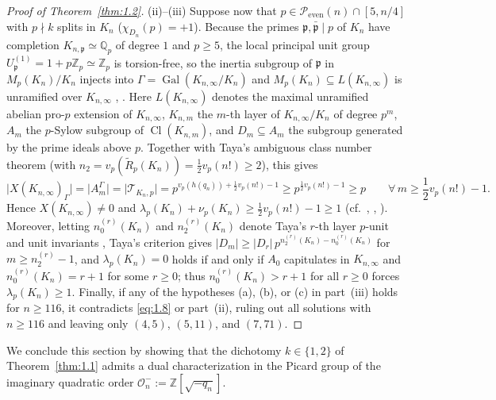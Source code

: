 \documentclass[11pt,reqno]{amsart}
\theoremstyle{remark}
\numberwithin{equation}{section}
\newcommand{\Z}{\mathbb{Z}}
\newcommand{\Q}{\mathbb{Q}}
\newcommand{\Peven}{\mathcal{P}_{\mathrm{even}}}
\DeclareMathOperator{\Gal}{Gal}
\DeclareMathOperator{\Cl}{Cl}
\begin{document}
\begin{proof}[Proof of Theorem~\ref{thm:1.2}]
(ii)--(iii) Suppose now that $p \in \Peven(n) \cap [5, n/4]$ with $p \nmid k$ splits in $K_n$ ($\chi_{D_n}(p) = +1$). Because the primes $\mathfrak{p}, \bar{\mathfrak{p}} \mid p$ of $K_n$ have completion $K_{n,\mathfrak{p}} \simeq \Q_p$ of degree $1$ and $p \ge 5$, the local principal unit group $U_{\mathfrak{p}}^{(1)} = 1 + p\Z_p \simeq \Z_p$ is torsion-free, so the inertia subgroup of $\mathfrak{p}$ in $M_p(K_n)/K_n$ injects into $\Gamma = \Gal(K_{n,\infty}/K_n)$ and $M_p(K_n) \subseteq L(K_{n,\infty})$ is unramified over $K_{n,\infty}$ \cite[Proposition~1]{Ozaki1997}, \cite[Lemmas~6.1--6.2]{Yanagisawa2026}. Here $L(K_{n,\infty})$ denotes the maximal unramified abelian pro-$p$ extension of $K_{n,\infty}$, $K_{n,m}$ the $m$-th layer of $K_{n,\infty}/K_n$ of degree $p^m$, $A_m$ the $p$-Sylow subgroup of $\Cl(K_{n,m})$, and $D_m \subseteq A_m$ the subgroup generated by the prime ideals above $p$. Together with Taya's ambiguous class number theorem \cite[Corollary~2 and Proposition~1]{Taya1996} (with $n_2 = v_p(\widetilde{R}_p(K_n)) = \frac{1}{2}v_p(n!) \ge 2$), this gives
\[
\bigl|X(K_{n,\infty})_\Gamma\bigr| = \bigl|A_m^\Gamma\bigr| = \bigl|\mathcal{T}_{K_n, p}\bigr| = p^{v_p(h(q_n)) + \frac{1}{2}v_p(n!) - 1} \ge p^{\frac{1}{2}v_p(n!) - 1} \ge p \qquad \forall\, m \ge \frac{1}{2}v_p(n!) - 1.
\]
Hence $X(K_{n,\infty}) \ne 0$ and $\lambda_p(K_n) + \nu_p(K_n) \ge \frac{1}{2}v_p(n!) - 1 \ge 1$ (cf.\ \cite[Theorem~1]{FukudaKomatsu1986}, \cite[Theorem~6]{Jaulent2024}, \cite[Corollary~6.4]{Yanagisawa2026}). Moreover, letting $n_0^{(r)}(K_n)$ and $n_2^{(r)}(K_n)$ denote Taya's $r$-th layer $p$-unit and unit invariants \cite[§2]{Taya1996}, Taya's criterion \cite[Corollary~3 and Theorem~4]{Taya1996} gives $|D_m| \ge |D_r|\,p^{n_2^{(r)}(K_n) - n_0^{(r)}(K_n)}$ for $m \ge n_2^{(r)} - 1$, and $\lambda_p(K_n) = 0$ holds if and only if $A_0$ capitulates in $K_{n,\infty}$ and $n_0^{(r)}(K_n) = r + 1$ for some $r \ge 0$; thus $n_0^{(r)}(K_n) > r + 1$ for all $r \ge 0$ forces $\lambda_p(K_n) \ge 1$. Finally, if any of the hypotheses \textup{(a)}, \textup{(b)}, or \textup{(c)} in part~(iii) holds for $n \ge 116$, it contradicts \eqref{eq:1.8} or part~(ii), ruling out all solutions with $n \ge 116$ and leaving only $(4, 5)$, $(5, 11)$, and $(7, 71)$.
\end{proof}

We conclude this section by showing that the dichotomy $k \in \{1, 2\}$ of Theorem~\ref{thm:1.1} admits a dual characterization in the Picard group of the imaginary quadratic order $\mathcal{O}_n^- := \Z[\sqrt{-q_n}]$.
\end{document}
